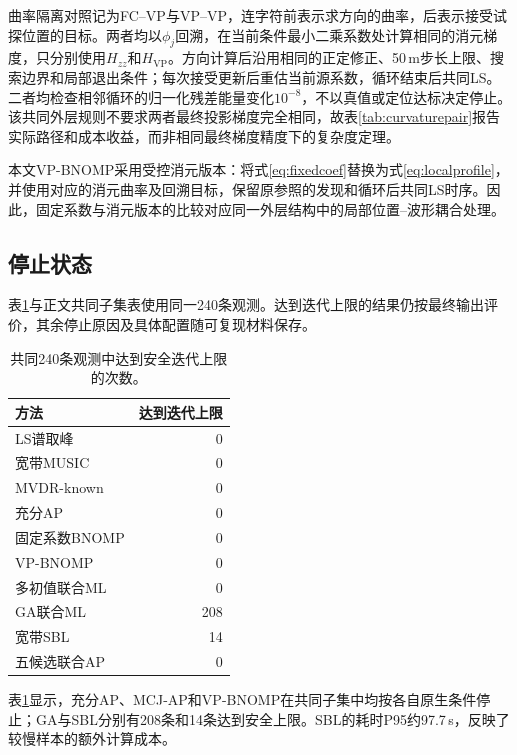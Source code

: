 \documentclass[a4paper]{cas-sc}
\numberwithin{equation}{section}
\numberwithin{figure}{section}
\numberwithin{table}{section}
\begin{document}
曲率隔离对照记为FC--VP与VP--VP，连字符前表示求方向的曲率，后表示接受试探位置的目标。两者均以$\phi_j$回溯，在当前条件最小二乘系数处计算相同的消元梯度，只分别使用$H_{zz}$和$H_{\mathrm{VP}}$。方向计算后沿用相同的正定修正、50\,m步长上限、搜索边界和局部退出条件；每次接受更新后重估当前源系数，循环结束后共同LS。二者均检查相邻循环的归一化残差能量变化$10^{-8}$，不以真值或定位达标决定停止。该共同外层规则不要求两者最终投影梯度完全相同，故表\ref{tab:curvaturepair}报告实际路径和成本收益，而非相同最终梯度精度下的复杂度定理。

本文VP-BNOMP采用受控消元版本：将式\eqref{eq:fixedcoef}替换为式\eqref{eq:localprofile}，并使用对应的消元曲率及回溯目标，保留原参照的发现和循环后共同LS时序。因此，固定系数与消元版本的比较对应同一外层结构中的局部位置--波形耦合处理。

\subsection{停止状态}
表\ref{tab:auxiliary}与正文共同子集表使用同一240条观测。达到迭代上限的结果仍按最终输出评价，其余停止原因及具体配置随可复现材料保存。

\begin{table}[pos=H]\centering\small
\caption{共同240条观测中达到安全迭代上限的次数。}\label{tab:auxiliary}
\begin{tabular}{@{}lr@{}}\toprule
方法 & 达到迭代上限\\\midrule
LS谱取峰 & 0\\
宽带MUSIC & 0\\
MVDR-known & 0\\
充分AP & 0\\
固定系数BNOMP & 0\\
VP-BNOMP & 0\\
多初值联合ML & 0\\
GA联合ML & 208\\
宽带SBL & 14\\
五候选联合AP & 0\\
\bottomrule\end{tabular}\end{table}


表\ref{tab:auxiliary}显示，充分AP、MCJ-AP和VP-BNOMP在共同子集中均按各自原生条件停止；GA与SBL分别有208条和14条达到安全上限。SBL的耗时P95约97.7\,s，反映了较慢样本的额外计算成本。
\end{document}
